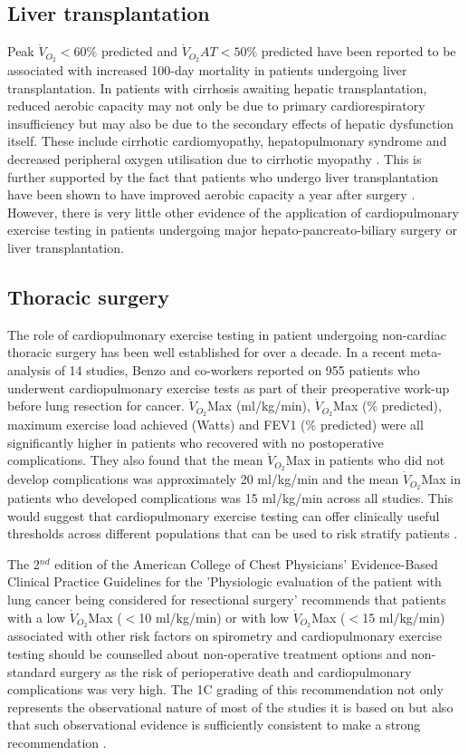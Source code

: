 \subsection{Liver transplantation}
Peak $\dot{V}_{O_2}<60\%$ predicted and $\dot{V}_{O_2}AT<50\%$ predicted have been reported to be associated with increased 100-day mortality in patients undergoing liver transplantation. 
In patients with cirrhosis awaiting hepatic transplantation, reduced aerobic capacity may not only be due to primary cardiorespiratory insufficiency but may also be due to the secondary effects of hepatic dysfunction itself. 
These include cirrhotic cardiomyopathy, hepatopulmonary syndrome and decreased peripheral oxygen utilisation due to cirrhotic myopathy \parencite{epstein_aerobic_2004}. 
This is further supported by the fact that patients who undergo liver transplantation have been shown to have improved aerobic capacity a year after surgery \parencite{iscar_functional_2009}. 
However, there is very little other evidence of the application of cardiopulmonary exercise testing in patients undergoing major hepato-pancreato-biliary surgery or liver transplantation.

\subsection{Thoracic surgery}
The role of cardiopulmonary exercise testing in patient undergoing non-cardiac thoracic surgery has been well established for over a decade. 
In a recent meta-analysis of 14 studies, Benzo and co-workers reported on 955 patients who underwent cardiopulmonary exercise tests as part of their preoperative work-up before lung resection for cancer. $\dot{V}_{O_2}$Max (ml/kg/min), $\dot{V}_{O_2}$Max (\% predicted), maximum exercise load achieved (Watts) and FEV1 (\% predicted) were all significantly higher in patients who recovered with no postoperative complications. 
They also found that the mean $\dot{V}_{O_2}$Max in patients who did not develop complications was approximately 20 ml/kg/min and the mean $\dot{V}_{O_2}$Max in patients who developed complications was 15 ml/kg/min across all studies. 
This would suggest that cardiopulmonary exercise testing can offer clinically useful thresholds across different populations that can be used to risk stratify patients \parencite{benzo_complications_2007}. 

The 2$^{nd}$ edition of the American College of Chest Physicians' Evidence-Based Clinical Practice Guidelines for the 'Physiologic evaluation of the patient with lung cancer being considered for resectional surgery' recommends that patients with a low $\dot{V}_{O_2}$Max ($<$10 ml/kg/min) or with low $\dot{V}_{O_2}$Max ($<$15 ml/kg/min) associated with other risk factors on spirometry and cardiopulmonary exercise testing should be counselled about non-operative treatment options and non-standard surgery as the risk of perioperative death and cardiopulmonary complications was very high. 
The 1C grading of this recommendation not only represents the observational nature of most of the studies it is based on but also that such observational evidence is sufficiently consistent \parencite{benzo_complications_2007} to make a strong recommendation \parencite{colice_physiologic_2007}. 

